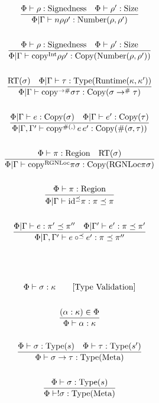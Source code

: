 \documentclass {article}
\begin{document}
\begin{gather*}
\\
\frac
{\Phi \vdash \rho : \text{Signedness} \quad \Phi \vdash \rho' : \text{Size}}
{\Phi | \Gamma \vdash n \rho \rho' : \text{Number}(\rho, \rho')} \\
\\
\frac
{\Phi \vdash \rho : \text{Signedness} \quad \Phi \vdash \rho' : \text{Size}}
{\Phi | \Gamma \vdash \text{copy}^\text{Int} \rho \rho' : \text{Copy} (\text{Number} (\rho, \rho'))} \\
\\
\frac
{\text{RT} (\sigma) \quad \Phi | \Gamma \vdash \tau : \text{Type}(\text{Runtime}(\kappa, \kappa'))}
{\Phi | \Gamma \vdash \text{copy}^{\to\#} \sigma \tau : \text{Copy} (\sigma \to^\# \tau)} \\
\\
\frac
{\Phi | \Gamma \vdash e : \text{Copy} (\sigma) \quad \Phi | \Gamma \vdash e' : \text{Copy} (\tau)}
{\Phi | \Gamma, \Gamma' \vdash \text{copy}^{\#(,)} \, e \, e' : \text{Copy} (\#(\sigma, \tau))} \\
\\
\frac
{\Phi \vdash \pi : \text{Region} \quad \text{RT} (\sigma)}
{\Phi | \Gamma \vdash \text{copy}^\text{RGNLoc} \pi \sigma : \text{Copy} (\text{RGNLoc} \pi \sigma)} \\
\\
\frac
{\Phi \vdash \pi : \text{Region}}
{\Phi | \Gamma \vdash \text{id}^{\preceq} \pi : \pi \preceq \pi} \\
\\
\frac
{\Phi | \Gamma \vdash e : \pi' \preceq \pi'' \quad \Phi | \Gamma' \vdash e' : \pi \preceq \pi'}
{\Phi | \Gamma, \Gamma' \vdash e \circ^\preceq e' : \pi \preceq \pi''} \\
\\
\\
\\
\Phi \vdash \sigma : \kappa \tag* {[\text{Type Validation}]} \\
\\
\frac
{(\alpha : \kappa) \in \Phi}
{\Phi \vdash \alpha : \kappa} \\
\\
\frac
{\Phi \vdash \sigma : \text{Type} (s) \quad \Phi \vdash \tau : \text{Type} (s')}
{\Phi \vdash \sigma \to \tau : \text{Type} (\text{Meta})} \\
\\
\frac
{\Phi \vdash \sigma : \text{Type} (s)}
{\Phi \vdash !\sigma : \text{Type} (\text{Meta})} \\
\\

\end{gather*}
\end{document}

